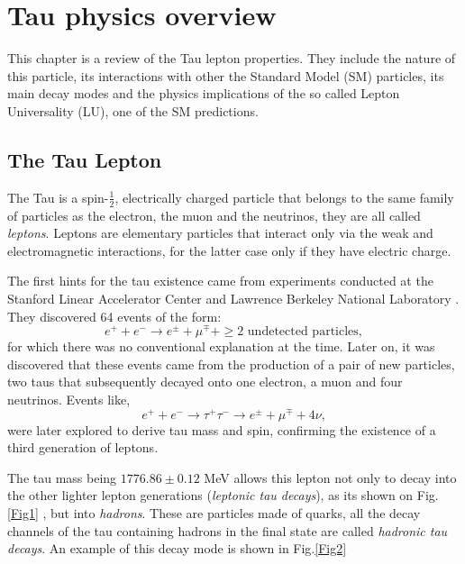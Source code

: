 \chapter{Tau physics overview}\label{chap:relatedwork}
This chapter is a review of the Tau lepton properties. They include the nature of this particle, its interactions with other the Standard Model (SM) particles, its main decay modes and the physics implications of the so called Lepton Universality (LU), one of the SM predictions.  

\section{The Tau Lepton}\label{chap2sec1}
The Tau is a spin-$\frac{1}{2}$, electrically charged particle that belongs to the same family of particles as the electron, the muon and the neutrinos, they are all called \textit{leptons}. Leptons are elementary particles that interact only via the weak and electromagnetic interactions, for the latter case only if they have electric charge.  

The first hints for the tau existence came from experiments conducted at the Stanford Linear Accelerator Center and Lawrence Berkeley National Laboratory \cite{PhysRevLett.35.1489}. They discovered 64 events of the form:
\begin{equation}
	e^+ + e^- \to e^\pm + \mu^\mp + \geq \text{2 undetected particles},
\end{equation}
for which there was no conventional explanation at the time. Later on, it was discovered that these events came from the production of a pair of new particles, two taus that subsequently decayed onto one electron, a muon and four neutrinos. Events like,
\begin{equation}
e^+ + e^- \to \tau^+ \tau^- \to e^\pm + \mu^\mp + 4\nu,
\end{equation}	
were later explored to derive tau mass and spin, confirming the existence of a third generation of leptons. 

The tau mass being $1776.86 \pm 0.12$ MeV allows this lepton not only to decay into the other lighter lepton generations (\textit{leptonic tau decays}), as its shown on Fig.\ref{Fig1}  , but into \textit{hadrons}. These are particles made of quarks, all the decay channels of the tau containing hadrons in the final state are called \textit{hadronic tau decays}. An example of this decay mode is shown in Fig.\ref{Fig2}

